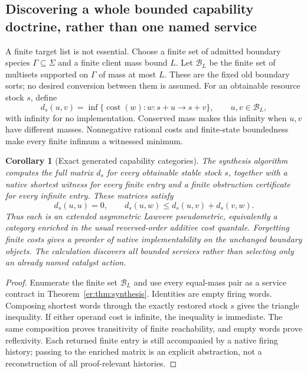\documentclass[11pt]{article}
\newtheorem{corollary}[theorem]{Corollary}
\theoremstyle{definition}
\theoremstyle{remark}
\begin{document}
\subsection{Discovering a whole bounded capability doctrine, rather than one named service}
A finite target list is not essential. Choose a finite set of admitted boundary species $\Gamma\subseteq\Sigma$ and a finite client mass bound $L$. Let $\mathcal B_L$ be the finite set of multisets supported on $\Gamma$ of mass at most $L$. These are the fixed old boundary sorts; no desired conversion between them is assumed. For an obtainable resource stock $s$, define
\[
 d_s(u,v)=\inf\{\operatorname{cost}(w):w:s+u\to s+v\},
 \qquad u,v\in\mathcal B_L,
\]
with infinity for no implementation. Conserved mass makes this infinity when $u,v$ have different masses. Nonnegative rational costs and finite-state boundedness make every finite infimum a witnessed minimum.

\begin{corollary}[Exact generated capability categories]\label{er:cor:doctrine}
The synthesis algorithm computes the full matrix $d_s$ for every obtainable stable stock $s$, together with a native shortest witness for every finite entry and a finite obstruction certificate for every infinite entry. These matrices satisfy
\[
 d_s(u,u)=0,\qquad d_s(u,w)\leq d_s(u,v)+d_s(v,w).
\]
Thus each is an extended asymmetric Lawvere pseudometric, equivalently a category enriched in the usual reversed-order additive cost quantale. Forgetting finite costs gives a preorder of native implementability on the unchanged boundary objects. The calculation discovers all bounded services rather than selecting only an already named catalyst action.
\end{corollary}
\begin{proof}
Enumerate the finite set $\mathcal B_L$ and use every equal-mass pair as a service contract in Theorem~\ref{er:thm:synthesis}. Identities are empty firing words. Composing shortest words through the exactly restored stock $s$ gives the triangle inequality. If either operand cost is infinite, the inequality is immediate. The same composition proves transitivity of finite reachability, and empty words prove reflexivity. Each returned finite entry is still accompanied by a native firing history; passing to the enriched matrix is an explicit abstraction, not a reconstruction of all proof-relevant histories.
\end{proof}
\end{document}
